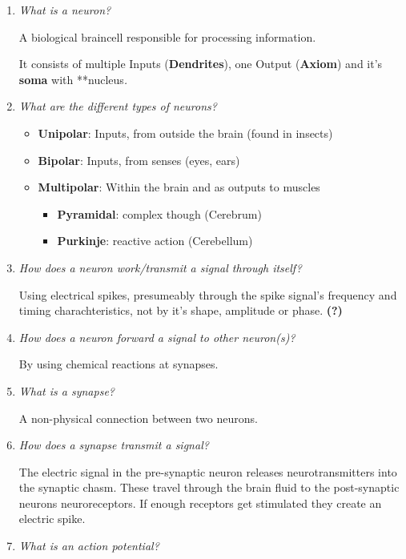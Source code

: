 \documentclass[
    fontsize      = 11pt,
    paper         = a4,
    twoside       = false,
    parskip       = half,
    pagesize      = false,
]{scrartcl}
\providecommand{\tightlist}{%
  \setlength{\itemsep}{0pt}\setlength{\parskip}{0pt}}
\begin{document}
\begin{enumerate}
\def\labelenumi{\arabic{enumi}.}
\item
  \emph{What is a neuron?}

  A biological braincell responsible for processing information.

  It consists of multiple Inputs (\textbf{Dendrites}), one Output
  (\textbf{Axiom}) and it's \textbf{soma} with **nucleus\emph{.}
\item
  \emph{What are the different types of neurons?}

  \begin{itemize}
  \tightlist
  \item
    \textbf{Unipolar}: Inputs, from outside the brain (found in insects)
  \item
    \textbf{Bipolar}: Inputs, from senses (eyes, ears)
  \item
    \textbf{Multipolar}: Within the brain and as outputs to muscles

    \begin{itemize}
    \tightlist
    \item
      \textbf{Pyramidal}: complex though (Cerebrum)
    \item
      \textbf{Purkinje}: reactive action (Cerebellum)
    \end{itemize}
  \end{itemize}
\item
  \emph{How does a neuron work/transmit a signal through itself?}

  Using electrical spikes, presumeably through the spike signal's
  frequency and timing charachteristics, not by it's shape, amplitude or
  phase. \textbf{(?)}
\item
  \emph{How does a neuron forward a signal to other neuron(s)?}

  By using chemical reactions at synapses.
\item
  \emph{What is a synapse?}

  A non-physical connection between two neurons.
\item
  \emph{How does a synapse transmit a signal?}

  The electric signal in the pre-synaptic neuron releases
  neurotransmitters into the synaptic chasm. These travel through the
  brain fluid to the post-synaptic neurons neuroreceptors. If enough
  receptors get stimulated they create an electric spike.
\item
  \emph{What is an action potential?}


\end{enumerate}
\end{document}
